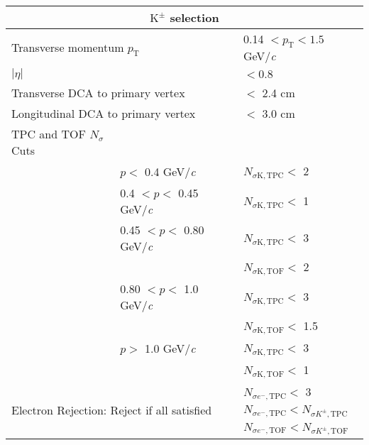\documentclass[ALICE,manyauthors]{cernphprep}
\newcommand{\Kpm}{$\mathrm{K^{\pm}}$\xspace}
\begin{document}
\begin{table}[htbp]
 \centering
  \begin{tabular}{lc|c|l}
   \hline  
   \multicolumn{4}{c}{\textbf{\Kpm selection}} \\
   \hline
   \multicolumn{3}{l|}{Transverse momentum $p_{\mathrm{T}}$} & 0.14 $< p_{\mathrm{T}} < 1.5$ GeV/\textit{c} \\
   \hline
   \multicolumn{3}{l|}{$|\eta|$} & $< 0.8$ \\
   \hline
   \multicolumn{3}{l|}{Transverse DCA to primary vertex} & $<$ 2.4 cm \\
   \hline
   \multicolumn{3}{l|}{Longitudinal DCA to primary vertex} & $<$ 3.0 cm \\
   \hline

   TPC and TOF $N_{\sigma}$ Cuts & \multicolumn{3}{c}{} \\
   \cline{2-4}
    & \multicolumn{1}{l}{$p <$ 0.4 GeV/\textit{c}} &  & $N_{\sigma \mathrm{K,TPC}} <$ 2 \\
   \cline{2-4}
    & \multicolumn{1}{l}{0.4 $< p <$ 0.45 GeV/\textit{c}} & & $N_{\sigma \mathrm{K,TPC}} <$ 1 \\
   \cline{2-4}     
    & \multicolumn{1}{l}{0.45 $< p <$ 0.80 GeV/\textit{c}} & & $N_{\sigma \mathrm{K,TPC}} <$ 3 \\ 
   \multicolumn{3}{c|}{} & $N_{\sigma \mathrm{K,TOF}} <$ 2 \\
   \cline{2-4}
    & \multicolumn{1}{l}{0.80 $< p <$ 1.0 GeV/\textit{c}} & & $N_{\sigma \mathrm{K,TPC}} <$ 3 \\
   \multicolumn{3}{c|}{} & $N_{\sigma \mathrm{K,TOF}} <$ 1.5 \\  
   \cline{2-4}
    & \multicolumn{1}{l}{$p >$ 1.0 GeV/\textit{c}} & & $N_{\sigma \mathrm{K,TPC}} <$ 3 \\
   \multicolumn{3}{c|}{} & $N_{\sigma \mathrm{K,TOF}} <$ 1 \\  
   \hline
   \multicolumn{3}{l|}{\multirow{3}{*}{Electron Rejection: Reject if all satisfied}} & $N_{\sigma e^{-},\mathrm{TPC}} < $ 3 \\
   \multicolumn{3}{c|}{} & $N_{\sigma e^{-},\mathrm{TPC}} < N_{\sigma K^{\pm},\mathrm{TPC}}$ \\
   \multicolumn{3}{c|}{} & $N_{\sigma e^{-},\mathrm{TOF}} < N_{\sigma K^{\pm},\mathrm{TOF}}$ \\
   \hline
   

\end{tabular}
\end{table}
\end{document}
